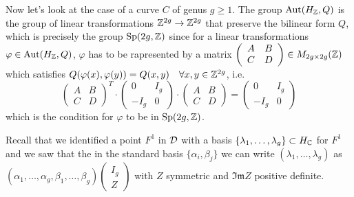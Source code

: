 \documentclass[../main.tex]{subfiles}
\begin{document}
\begin{es} Now let's look at the case of a curve $C$ of genus $g \geq 1$. The group $\mathrm{Aut}(H_{\mathbb{Z}},Q)$ is the group of linear transformations $\mathbb{Z}^{2g} \to \mathbb{Z}^{2g}$ that preserve the bilinear form $Q$, which is precisely the group $\mathrm{Sp}(2g,\mathbb{Z})$
 since for a linear transformations $\varphi \in \mathrm{Aut}(H_{\mathbb{Z}},Q) $, $\varphi$ has to be rapresented by a matrix $\left( \begin{array}{cc} A & B \\ C & D \end{array} \right) \in M_{2g\times 2g}(\mathbb{Z})$ which satisfies $Q(\varphi(x),\varphi(y))=Q(x,y) \quad \forall x,y \in \mathbb{Z}^{2g}$, i.e. 
\[
\left( \begin{array}{cc} A & B \\ C & D \end{array} \right)^T  \cdot \left( \begin{array}{cc} 0 & I_g \\ -I_g & 0 \end{array} \right) \cdot \left( \begin{array}{cc} A & B \\ C & D \end{array} \right) = \left( \begin{array}{cc} 0 & I_g \\ -I_g & 0 \end{array} \right)
\]
which is the condition for $\varphi$ to be in  $\mathrm{Sp}(2g,\mathbb{Z})$.


Recall that we identified a point $F^1$ in $\mathcal{D}$ with a basis $ \{ \lambda_1, \dots , \lambda_g \} \subset H_{\mathbb{C}}$ for $F^1$ and we saw that the in the standard basis $ \{ \alpha_i, \beta_j \}$ we can write $(\lambda_1, \dots , \lambda_g)$ as $(\alpha_1, \dots , \alpha_g ,\beta_1, \dots , \beta_g) \left(\begin{array}{c} I_g \\ Z \end{array} \right)$ with $Z$ symmetric and $\mathfrak{Im} Z$ positive definite. 


\end{es}
\end{document}
